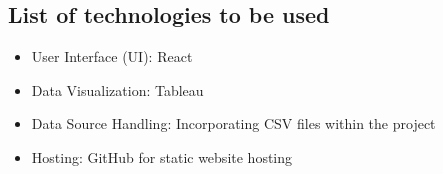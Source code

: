 \documentclass{article}
\begin{document}
\subsection{List of technologies to be used}
\begin{itemize}
    \item User Interface (UI): React
    \item Data Visualization: Tableau
    \item Data Source Handling: Incorporating CSV files within the project
    \item Hosting: GitHub for static website hosting
\end{itemize}
\end{document}
